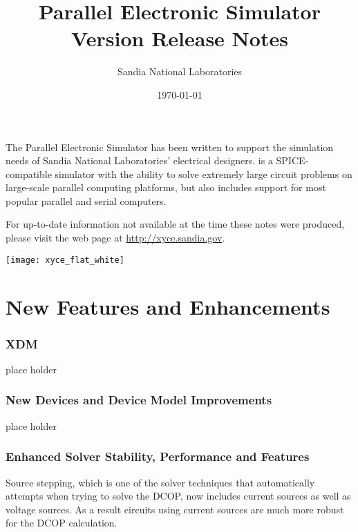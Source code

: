 \documentclass[letterpaper]{scrartcl}
\title{\XyceTitle{} Parallel Electronic Simulator\\
Version \XyceVersionVar{} Release Notes}
\author{ Sandia National Laboratories}
\date{\today}
\begin{document}
\maketitle

The \XyceTM{} Parallel Electronic Simulator has been written to support the
simulation needs of Sandia National Laboratories' electrical designers.
\XyceTM{} is a SPICE-compatible simulator with the ability to solve extremely
large circuit problems on large-scale parallel computing platforms, but also
includes support for most popular parallel and serial computers.

For up-to-date information not available at the time these notes were produced,
please visit the \XyceTM{} web page at
{\color{XyceDeepRed}\url{http://xyce.sandia.gov}}.

\tableofcontents
\vspace*{\fill}
\parbox{\textwidth}
{
  \hfill
  \texttt{[image: xyce\_flat\_white]}
}


\newpage
\section{New Features and Enhancements}

\subsubsection*{XDM}
\begin{XyceItemize}
  \item place holder
\end{XyceItemize}

\subsubsection*{New Devices and Device Model Improvements}
\begin{XyceItemize}
  \item place holder
\end{XyceItemize}

\subsubsection*{Enhanced Solver Stability, Performance and Features}
\begin{XyceItemize}
\item Source stepping, which is one of the solver techniques that \Xyce{} automatically 
attempts when trying to solve the DCOP, now includes current sources as well as 
  voltage sources.  As a result circuits using current sources are much more 
  robust for the DCOP calculation.
\end{XyceItemize}
\end{document}
